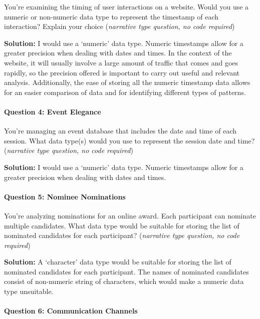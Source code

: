 \documentclass[
]{article}
\begin{document}
You're examining the timing of user interactions on a website. Would you
use a numeric or non-numeric data type to represent the timestamp of
each interaction? Explain your choice (\emph{narrative type question, no
code required})

\textbf{Solution:} I would use a `numeric' data type. Numeric timestamps
allow for a greater precision when dealing with dates and times. In the
context of the website, it will usually involve a large amount of
traffic that comes and goes rapidly, so the precision offered is
important to carry out useful and relevant analysis. Additionally, the
ease of storing all the numeric timestamp data allows for an easier
comparison of data and for identifying different types of patterns.

\hypertarget{question-4-event-elegance}{%
\paragraph{Question 4: Event Elegance}\label{question-4-event-elegance}}

You're managing an event database that includes the date and time of
each session. What data type(s) would you use to represent the session
date and time? (\emph{narrative type question, no code required})

\textbf{Solution:} I would use a `numeric' data type. Numeric timestamps
allow for a greater precision when dealing with dates and times.

\hypertarget{question-5-nominee-nominations}{%
\paragraph{Question 5: Nominee
Nominations}\label{question-5-nominee-nominations}}

You're analyzing nominations for an online award. Each participant can
nominate multiple candidates. What data type would be suitable for
storing the list of nominated candidates for each participant?
(\emph{narrative type question, no code required})

\textbf{Solution:} A `character' data type would be suitable for storing
the list of nominated candidates for each participant. The names of
nominated candidates consist of non-numeric string of characters, which
would make a numeric data type unsuitable.

\hypertarget{question-6-communication-channels}{%
\paragraph{Question 6: Communication
Channels}\label{question-6-communication-channels}}
\end{document}
